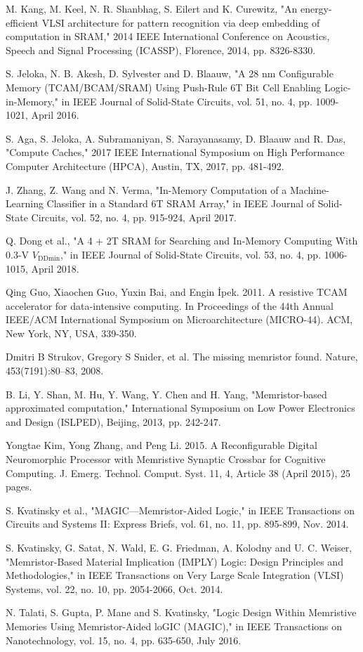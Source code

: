 \documentclass[conference,compsoc]{IEEEtran}
\begin{document}
\begin{thebibliography}{10}
 M. Kang, M. Keel, N. R. Shanbhag, S. Eilert and K. Curewitz, "An energy-efficient VLSI architecture for pattern recognition via deep embedding of computation in SRAM," 2014 IEEE International Conference on Acoustics, Speech and Signal Processing (ICASSP), Florence, 2014, pp. 8326-8330.

 S. Jeloka, N. B. Akesh, D. Sylvester and D. Blaauw, "A 28 nm Configurable Memory (TCAM/BCAM/SRAM) Using Push-Rule 6T Bit Cell Enabling Logic-in-Memory," in IEEE Journal of Solid-State Circuits, vol. 51, no. 4, pp. 1009-1021, April 2016.

 S. Aga, S. Jeloka, A. Subramaniyan, S. Narayanasamy, D. Blaauw and R. Das, "Compute Caches," 2017 IEEE International Symposium on High Performance Computer Architecture (HPCA), Austin, TX, 2017, pp. 481-492.

 J. Zhang, Z. Wang and N. Verma, "In-Memory Computation of a Machine-Learning Classifier in a Standard 6T SRAM Array," in IEEE Journal of Solid-State Circuits, vol. 52, no. 4, pp. 915-924, April 2017.

 Q. Dong et al., "A 4 + 2T SRAM for Searching and In-Memory Computing With 0.3-V $V_{\mathrm {DDmin}}$," in IEEE Journal of Solid-State Circuits, vol. 53, no. 4, pp. 1006-1015, April 2018.

 Qing Guo, Xiaochen Guo, Yuxin Bai, and Engin İpek. 2011. A resistive TCAM accelerator for data-intensive computing. In Proceedings of the 44th Annual IEEE/ACM International Symposium on Microarchitecture (MICRO-44). ACM, New York, NY, USA, 339-350.

 Dmitri B Strukov, Gregory S Snider, et al. The missing memristor found. Nature, 453(7191):80–83, 2008.

 B. Li, Y. Shan, M. Hu, Y. Wang, Y. Chen and H. Yang, "Memristor-based approximated computation," International Symposium on Low Power Electronics and Design (ISLPED), Beijing, 2013, pp. 242-247.

 Yongtae Kim, Yong Zhang, and Peng Li. 2015. A Reconfigurable Digital Neuromorphic Processor with Memristive Synaptic Crossbar for Cognitive Computing. J. Emerg. Technol. Comput. Syst. 11, 4, Article 38 (April 2015), 25 pages.

 S. Kvatinsky et al., "MAGIC—Memristor-Aided Logic," in IEEE Transactions on Circuits and Systems II: Express Briefs, vol. 61, no. 11, pp. 895-899, Nov. 2014.

 S. Kvatinsky, G. Satat, N. Wald, E. G. Friedman, A. Kolodny and U. C. Weiser, "Memristor-Based Material Implication (IMPLY) Logic: Design Principles and Methodologies," in IEEE Transactions on Very Large Scale Integration (VLSI) Systems, vol. 22, no. 10, pp. 2054-2066, Oct. 2014.

 N. Talati, S. Gupta, P. Mane and S. Kvatinsky, "Logic Design Within Memristive Memories Using Memristor-Aided loGIC (MAGIC)," in IEEE Transactions on Nanotechnology, vol. 15, no. 4, pp. 635-650, July 2016.


\end{thebibliography}
\end{document}
